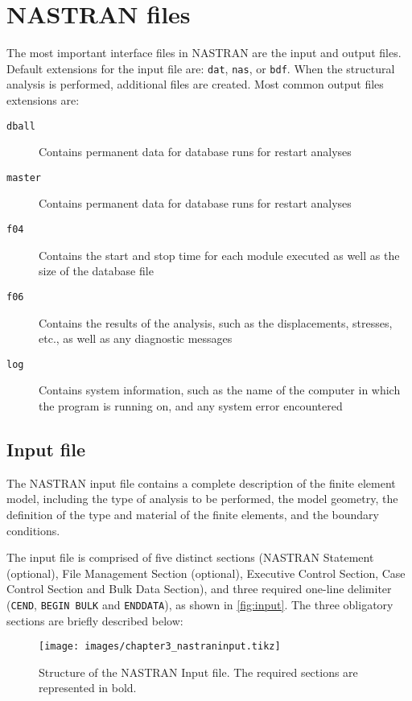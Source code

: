 \section{NASTRAN files}

The most important interface files in NASTRAN are the input and output files. Default extensions for the input file are: \texttt{dat}, \texttt{nas}, or \texttt{bdf}. When the structural analysis is performed, additional files are created. Most common output files extensions are: \cite{Nastran2001, Nastran2014}

\begin{description}
    \item[\texttt{dball}] Contains permanent data for database runs for restart analyses
    \item[\texttt{master}] Contains permanent data for database runs for restart analyses
    \item[\texttt{f04}] Contains the start and stop time for each module executed as well as the size of the database file
    \item[\texttt{f06}] Contains the results of the analysis, such as the displacements, stresses, etc., as well as any diagnostic messages
    \item[\texttt{log}] Contains system information, such as the name of the computer in which the program is running on, and any system error encountered
\end{description}

\subsection{Input file}

The NASTRAN input file contains a complete description of the finite element model, including the type of analysis to be performed, the model geometry, the definition of the type and material of the finite elements, and the boundary conditions.

The input file is comprised of five distinct sections (NASTRAN Statement (optional), File Management Section (optional), Executive Control Section, Case Control Section and Bulk Data Section), and three required one-line delimiter (\texttt{CEND}, \texttt{BEGIN BULK} and \texttt{ENDDATA}), as shown in \autoref{fig:input}. The three obligatory sections are briefly described below:

\begin{figure}[H]
    \caption{Structure of the NASTRAN Input file. The required sections are represented in bold.}
    \label{fig:input}
    \centering
    \vspace{1em}
    \texttt{[image: images/chapter3\_nastraninput.tikz]}
\end{figure}

